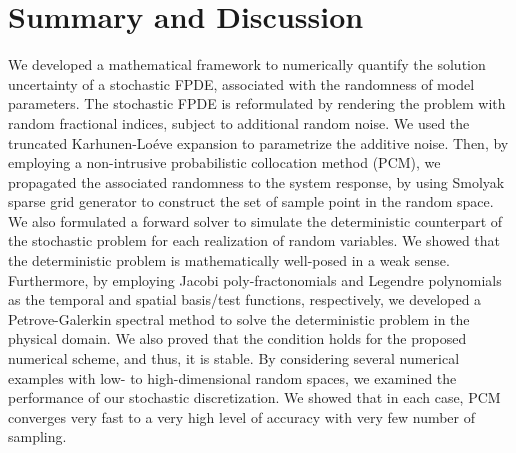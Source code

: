 
%
\section{Summary and Discussion}
\label{Sec: Summary and Conclusion} 
%
We developed a mathematical framework to numerically quantify the solution uncertainty of a stochastic FPDE, associated with the randomness of model parameters. The stochastic FPDE is reformulated by rendering the problem with random fractional indices, subject to additional random noise. We used the truncated Karhunen-Lo\'eve expansion to parametrize the additive noise. Then, by employing a non-intrusive probabilistic collocation method (PCM), we propagated the associated randomness to the system response, by using Smolyak sparse grid generator to construct the set of sample point in the random space. We also formulated a forward solver to simulate the deterministic counterpart of the stochastic problem for each realization of random variables. We showed that the deterministic problem is mathematically well-posed in a weak sense. Furthermore, by employing Jacobi poly-fractonomials and Legendre polynomials as the temporal and spatial basis/test functions, respectively, we developed a Petrove-Galerkin spectral method to solve the deterministic problem in the physical domain. We also proved that the  condition holds for the proposed numerical scheme, and thus, it is stable. By considering several numerical examples with low- to high-dimensional random spaces, we examined the performance of our stochastic discretization. We showed that in each case, PCM converges very fast to a very high level of accuracy with very few number of sampling. 

